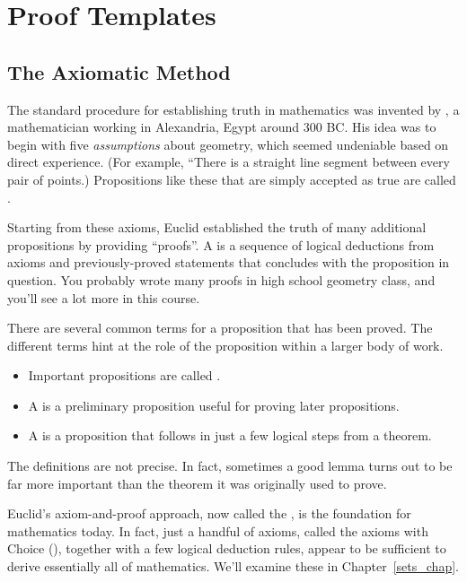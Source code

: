 \chapter{Proof Templates}\label{templates_chap}

\section{The Axiomatic Method}

The standard procedure for establishing truth in mathematics was invented
by , a mathematician working in Alexandria, Egypt around 300 BC.
His idea was to begin with five \textit{assumptions} about geometry, which
seemed undeniable based on direct experience.  (For example, ``There is a
straight line segment between every pair of points.)  Propositions like
these that are simply accepted as true are called .

Starting from these axioms, Euclid established the truth of many
additional propositions by providing ``proofs''.  A  is a
sequence of logical deductions from axioms and previously-proved
statements that concludes with the proposition in question.  You
probably wrote many proofs in high school geometry class, and you'll
see a lot more in this course.

There are several common terms for a proposition that has been proved.
The different terms hint at the role of the proposition within a
larger body of work.
%
\begin{itemize}
\item Important propositions are called .
\item A  is a preliminary proposition useful for proving
later propositions.
\item A  is a proposition that follows
in just a few logical steps from a theorem.  
\end{itemize}
%
The definitions are not precise.  In fact, sometimes a good lemma
turns out to be far more important than the theorem it was originally
used to prove.

Euclid's axiom-and-proof approach, now called the , is the foundation for mathematics today.  In fact, just a
handful of axioms, called the axioms  with Choice
(), together with a few logical deduction rules, appear to
be sufficient to derive essentially all of mathematics.  We'll examine
these in Chapter~\ref{sets_chap}.

